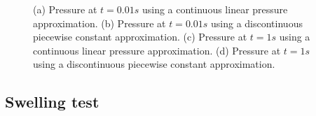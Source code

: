 \begin{table}[h]
\begin{center}
\end{center}
\caption{Parameters used for Terzaghi's problem. \label{tab:terzaghi_parameters}}
\end{table}

\begin{figure}[H]
  \centering
   \newline
\caption{(a) Pressure at $t=0.01s$ using a continuous linear pressure approximation. (b) Pressure at $t=0.01s$ using a discontinuous piecewise constant approximation. (c) Pressure at $t=1s$ using a continuous linear pressure approximation. (d) Pressure at $t=1s$ using a discontinuous piecewise constant approximation. \label{fig:compression}}

\end{figure}


\subsection{Swelling test}
\label{sec:swelling}

